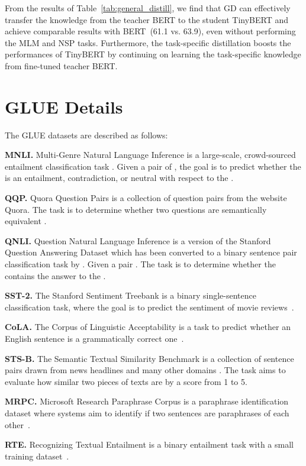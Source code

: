 \documentclass[11pt,a4paper]{article}
\begin{document}
 From the results of Table~\ref{tab:general_distill}, we find that GD can effectively transfer the knowledge from the teacher BERT to the student TinyBERT and achieve comparable results with BERT~(61.1 vs. 63.9), even without performing the MLM and NSP tasks. Furthermore, the task-specific distillation boosts the performances of TinyBERT by continuing on learning the task-specific knowledge from fine-tuned teacher BERT.


\section{GLUE Details}
\label{apx:glue}

The GLUE datasets are described as follows:

\noindent\textbf{MNLI.} Multi-Genre Natural Language Inference is a large-scale, crowd-sourced entailment classification task \citep{williams2018broad}. Given a pair of , the goal is to predict whether the  is an entailment, contradiction, or neutral with respect to the .

\noindent\textbf{QQP.} Quora Question Pairs is a collection of question pairs from the website Quora. The task is to determine whether two questions are semantically equivalent \citep{chen2018quora}.

\noindent\textbf{QNLI.} Question Natural Language Inference is a version of the Stanford Question Answering Dataset which has been converted to a binary sentence pair classification task by \citet{wang2018glue}. Given a pair . The task is to determine whether the  contains the answer to the .


\noindent\textbf{SST-2.} The Stanford Sentiment Treebank is a binary single-sentence classification task, where the goal is to predict the sentiment of movie reviews~\cite{socher2013recursive}.

\noindent\textbf{CoLA.} The Corpus of Linguistic Acceptability is a task to predict whether an English sentence is a grammatically correct one~\citep{warstadt2019neural}.

\noindent\textbf{STS-B.} The Semantic Textual Similarity Benchmark is a collection of sentence pairs drawn from news headlines and many other domains \citep{cer2017semeval}. The task aims to evaluate how similar two pieces of texts are by a score from 1 to 5.

\noindent\textbf{MRPC.} Microsoft Research Paraphrase Corpus is a paraphrase identification dataset where systems aim to identify if two sentences are paraphrases of each other~\cite{dolan2005automatically}.

\noindent\textbf{RTE.} Recognizing Textual Entailment is a binary entailment task with a small training dataset~\citep{bentivogli2009fifth}. 
\end{document}
